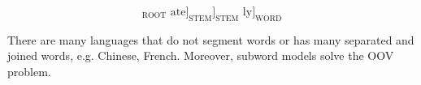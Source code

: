 \begin{equation}
[[\text{un }[[\text{fortun(e)}]_{\text{ROOT}} \text{ ate}]_{\text{STEM}}]_{\text{STEM}}\text{ ly}]_{\text{WORD}} \nonumber
\end{equation}

There are many languages that do not segment words or has many separated and joined words, e.g. Chinese, French.
Moreover, subword models solve the OOV problem.
